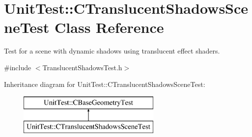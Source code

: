 \hypertarget{class_unit_test_1_1_c_translucent_shadows_scene_test}{}\section{Unit\+Test\+::C\+Translucent\+Shadows\+Scene\+Test Class Reference}
\label{class_unit_test_1_1_c_translucent_shadows_scene_test}


Test for a scene with dynamic shadows using translucent effect shaders.  




{\ttfamily \#include $<$Translucent\+Shadows\+Test.\+h$>$}

Inheritance diagram for Unit\+Test\+::C\+Translucent\+Shadows\+Scene\+Test\+:\begin{figure}[H]
\begin{center}
\leavevmode
\includegraphics[height=2.000000cm]{class_unit_test_1_1_c_translucent_shadows_scene_test}
\end{center}
\end{figure}
